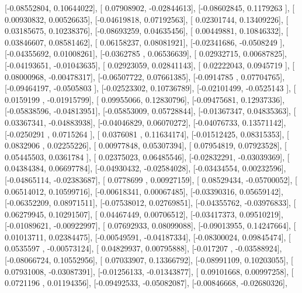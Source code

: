 \documentclass{article}
\begin{document}
       [-0.08552804,  0.10644022],
       [ 0.07908902, -0.02844613],
       [-0.08602845,  0.1179263 ],
       [ 0.00930832,  0.00526635],
       [-0.04619818,  0.07192563],
       [ 0.02301744,  0.13409226],
       [ 0.03185675,  0.10238376],
       [-0.08693259,  0.04635456],
       [ 0.00449881,  0.10846332],
       [ 0.03846607,  0.08581462],
       [ 0.06158237,  0.08081921],
       [-0.02341686, -0.0508249 ],
       [-0.04355692,  0.01008261],
       [-0.0362785 ,  0.06536639],
       [ 0.02932715,  0.00687825],
       [-0.04193651, -0.01043635],
       [ 0.02923059,  0.02841143],
       [ 0.02222043,  0.0945719 ],
       [ 0.08000968, -0.00478317],
       [-0.06507722,  0.07661385],
       [-0.0914785 ,  0.07704765],
       [-0.09464197, -0.0505803 ],
       [-0.02523302,  0.10736789],
       [-0.02101499, -0.0525143 ],
       [ 0.0159199 , -0.01915799],
       [ 0.09955066,  0.12830796],
       [-0.09475681,  0.12937336],
       [-0.05838596, -0.04813951],
       [-0.05853009,  0.05728844],
       [-0.01367347,  0.04835363],
       [ 0.03367341, -0.04883938],
       [-0.04046829,  0.06070272],
       [-0.04076733,  0.13571142],
       [-0.0250291 ,  0.0715264 ],
       [ 0.0376081 ,  0.11634174],
       [-0.01512425,  0.08315353],
       [ 0.0832906 ,  0.02255226],
       [ 0.00977848,  0.05307394],
       [ 0.07954819,  0.07923528],
       [ 0.05445503,  0.0361784 ],
       [ 0.02375023,  0.06485546],
       [-0.02832291, -0.03039369],
       [ 0.04384384,  0.06697784],
       [-0.04930432, -0.02584028],
       [-0.03434554,  0.00232596],
       [-0.04865114, -0.02383687],
       [ 0.0778699 ,  0.00927159],
       [ 0.08529434, -0.05700052],
       [ 0.06514012,  0.10599716],
       [-0.00618341,  0.00067485],
       [-0.03390316,  0.05659142],
       [-0.06352209,  0.08971511],
       [-0.07538012,  0.02769851],
       [-0.04355762, -0.03976833],
       [ 0.06279945,  0.10291507],
       [ 0.04467449,  0.00706512],
       [-0.03417373,  0.09510219],
       [-0.01089621, -0.00922997],
       [ 0.07692933,  0.08099088],
       [-0.09013955,  0.14247664],
       [ 0.01013711,  0.02384475],
       [-0.00549591, -0.04187334],
       [-0.08300024,  0.09845474],
       [ 0.0535597 , -0.00573124],
       [ 0.04829937,  0.00795888],
       [-0.017207  , -0.03588924],
       [-0.08066724,  0.10552956],
       [ 0.07033907,  0.13366792],
       [-0.08991109,  0.10203055],
       [ 0.07931008, -0.03087391],
       [-0.01256133, -0.01343877],
       [ 0.09101668,  0.00997258],
       [ 0.0721196 ,  0.01194356],
       [-0.09492533, -0.05082087],
       [-0.00846668, -0.02680326],
\end{document}
